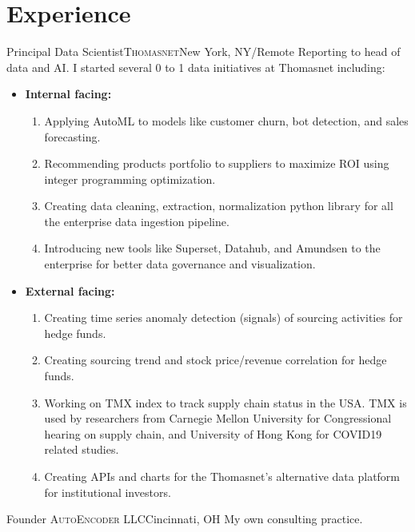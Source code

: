 \documentclass[12pt,a4paper,sans]{moderncv} %
\begin{document}
\section{Experience}
 
 {Principal Data Scientist}{\textsc{Thomasnet}}{New York, NY/Remote}{}{
Reporting to head of data and AI. I started several 0 to 1 data initiatives at Thomasnet including:}
\begin{itemize}
\item \textbf{Internal facing:}
    \begin{enumerate}
    \item Applying AutoML to models like customer churn, bot detection, and sales forecasting.
    \item Recommending products portfolio to suppliers to maximize ROI using integer programming optimization.
    \item  Creating data cleaning, extraction, normalization python library for all the enterprise data ingestion pipeline.
    \item Introducing new tools like Superset, Datahub, and Amundsen to the enterprise for better data governance and visualization.
    \end{enumerate}
\item \textbf{External facing:}
    \begin{enumerate}
    \item Creating time series anomaly detection (signals) of sourcing activities for hedge funds.
    \item Creating sourcing trend and stock price/revenue correlation for hedge funds.
    \item Working on TMX index to track supply chain status in the USA. TMX is used by researchers from Carnegie Mellon University for Congressional hearing on supply chain, and University of Hong Kong for COVID19 related studies.
    \item Creating APIs and charts for the Thomasnet's alternative data platform for institutional investors.
    \end{enumerate}
\end{itemize}
 \bigskip

 
 {Founder}
{\textsc{AutoEncoder LLC}}{Cincinnati, OH}{}{}
My own consulting practice.
\end{document}
